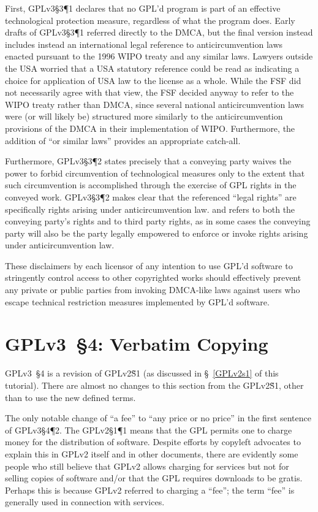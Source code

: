 First, GPLv3\S3\P1 declares that no GPL'd program is part of an effective
technological protection measure, regardless of what the program does.  Early
drafts of GPLv3\S3\P1 referred directly to the DMCA, but the final version
instead includes instead an international legal reference to
anticircumvention laws enacted pursuant to the 1996 WIPO treaty and any
similar laws.  Lawyers outside the USA worried that a USA statutory reference
could be read as indicating a choice for application of USA law to the
license as a whole.  While the FSF did not necessarily agree with that view,
the FSF decided anyway to refer to the WIPO treaty rather than DMCA, since
several national anticircumvention laws were (or will likely be) structured
more similarly to the anticircumvention provisions of the DMCA in their
implementation of WIPO\@.  Furthermore, the addition of ``or similar laws''
provides an appropriate catch-all.

Furthermore, GPLv3\S3\P2 states precisely that a conveying party waives the
power to forbid circumvention of technological measures only to the extent
that such circumvention is accomplished through the exercise of GPL rights in
the conveyed work.  GPLv3\S3\P2 makes clear that the referenced ``legal
rights'' are specifically rights arising under anticircumvention law.  and
refers to both the conveying party's rights and to third party rights, as in
some cases the conveying party will also be the party legally empowered to
enforce or invoke rights arising under anticircumvention law.

These disclaimers by each licensor of any intention to use GPL'd software to
stringently control access to other copyrighted works should effectively
prevent any private or public parties from invoking DMCA-like laws against
users who escape technical restriction measures implemented by GPL'd
software.

\section{GPLv3~\S4: Verbatim Copying}
\label{GPLv3s4}

GPLv3~\S4 is a revision of GPLv2\~S1 (as discussed in \S~\ref{GPLv2s1} of
this tutorial).   There are almost no changes to this section from the
GPLv2\~S1, other than to use the new defined terms.

The only notable change of ``a fee'' to ``any price or no price'' in the
first sentence of GPLv3\S4\P2.  The GPLv2\S1\P1 means that the GPL permits
one to charge money for the distribution of software.  Despite efforts by
copyleft advocates to explain this in GPLv2 itself and in other documents,
there are evidently some people who still believe that GPLv2 allows charging
for services but not for selling copies of software and/or that the GPL
requires downloads to be gratis.  Perhaps this is because GPLv2 referred to
charging a ``fee''; the term ``fee'' is generally used in connection with
services.

